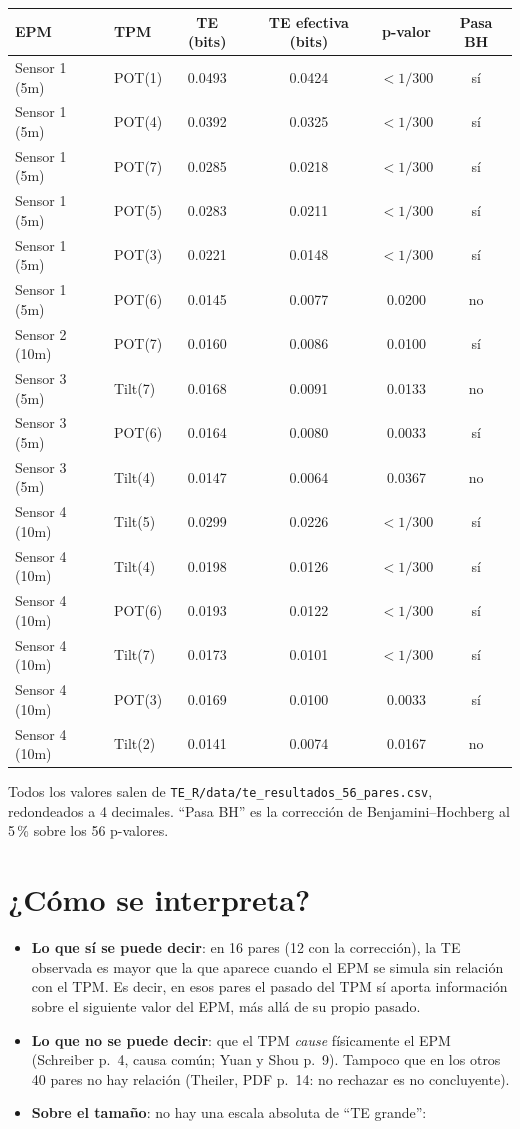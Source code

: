 \documentclass[11pt,openany]{book}
\newcommand{\archivo}[1]{\texttt{\small #1}}
\begin{document}
\begin{center}\small
\begin{tabular}{llcccc}
\toprule
EPM & TPM & TE (bits) & TE efectiva (bits) & p-valor & Pasa BH \\
\midrule
Sensor 1 (5m) & POT(1) & 0.0493 & 0.0424 & $<1/300$ & sí \\
Sensor 1 (5m) & POT(4) & 0.0392 & 0.0325 & $<1/300$ & sí \\
Sensor 1 (5m) & POT(7) & 0.0285 & 0.0218 & $<1/300$ & sí \\
Sensor 1 (5m) & POT(5) & 0.0283 & 0.0211 & $<1/300$ & sí \\
Sensor 1 (5m) & POT(3) & 0.0221 & 0.0148 & $<1/300$ & sí \\
Sensor 1 (5m) & POT(6) & 0.0145 & 0.0077 & 0.0200 & no \\
Sensor 2 (10m) & POT(7) & 0.0160 & 0.0086 & 0.0100 & sí \\
Sensor 3 (5m) & Tilt(7) & 0.0168 & 0.0091 & 0.0133 & no \\
Sensor 3 (5m) & POT(6) & 0.0164 & 0.0080 & 0.0033 & sí \\
Sensor 3 (5m) & Tilt(4) & 0.0147 & 0.0064 & 0.0367 & no \\
Sensor 4 (10m) & Tilt(5) & 0.0299 & 0.0226 & $<1/300$ & sí \\
Sensor 4 (10m) & Tilt(4) & 0.0198 & 0.0126 & $<1/300$ & sí \\
Sensor 4 (10m) & POT(6) & 0.0193 & 0.0122 & $<1/300$ & sí \\
Sensor 4 (10m) & Tilt(7) & 0.0173 & 0.0101 & $<1/300$ & sí \\
Sensor 4 (10m) & POT(3) & 0.0169 & 0.0100 & 0.0033 & sí \\
Sensor 4 (10m) & Tilt(2) & 0.0141 & 0.0074 & 0.0167 & no \\
\bottomrule
\end{tabular}
\end{center}
Todos los valores salen de \archivo{TE\_R/data/te\_resultados\_56\_pares.csv}, redondeados a 4 decimales. ``Pasa BH'' es la corrección de Benjamini--Hochberg al 5\,\% sobre los 56 p-valores.

\section{¿Cómo se interpreta?}

\begin{itemize}
\item \textbf{Lo que sí se puede decir}: en 16 pares (12 con la corrección), la TE observada es mayor que la que aparece cuando el EPM se simula sin relación con el TPM. Es decir, en esos pares el pasado del TPM sí aporta información sobre el siguiente valor del EPM, más allá de su propio pasado.
\item \textbf{Lo que no se puede decir}: que el TPM \emph{cause} físicamente el EPM (Schreiber p.~4, causa común; Yuan y Shou p.~9). Tampoco que en los otros 40 pares no hay relación (Theiler, PDF p.~14: no rechazar es no concluyente).
\item \textbf{Sobre el tamaño}: no hay una escala absoluta de ``TE grande'':
\end{itemize}
\end{document}
